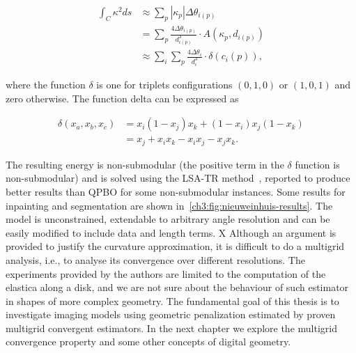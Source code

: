 \begin{align*}
	\int_{C}{\kappa ^2 ds} &\approx \sum_{p}{ |\kappa_{p}|\Delta \theta_{i(p)}} \\
	&= \sum_{p} \frac{4\Delta \theta _{i(p)}}{d^3_{i(p)}} \cdot A(\kappa_p,d_{i(p)}) \\
	&\approx \sum_{i}\sum_{p} \frac{4\Delta \theta _i}{d^3_i} \cdot \delta(c_i(p)),
\end{align*}

where the function $\delta$ is one for triplets configurations $(0,1,0)$ or $(1,0,1)$ and zero otherwise. The function delta can be expressed as

\begin{align*}
	\delta(x_a,x_b,x_c) &= x_i(1-x_j)x_k + (1-x_i)x_j(1-x_k) \\
	&= x_j + x_ix_k - x_ix_j - x_jx_k.
\end{align*}

The resulting energy is non-submodular (the positive term in the $\delta$ function is non-submodular) and is solved using the LSA-TR method~\cite{gorelick14local}, reported to produce better results than QPBO for some non-submodular instances. Some results for inpainting and segmentation are shown in~\cref{ch3:fig:nieuweinhuis-results}. The model is unconstrained, extendable to arbitrary angle resolution and can be easily modified to include data and length terms. 
X
Although an argument is provided to justify the curvature approximation, it is difficult to do a multigrid analysis, i.e., to analyse its convergence over different resolutions. The experiments provided by the authors are limited to the computation of the elastica along a disk, and we are not sure about the behaviour of such estimator in shapes of more complex geometry. The fundamental goal of this thesis is to investigate imaging models using geometric penalization estimated by proven multigrid convergent estimators. In the next chapter we explore the multigrid convergence property and some other concepts of digital geometry.

